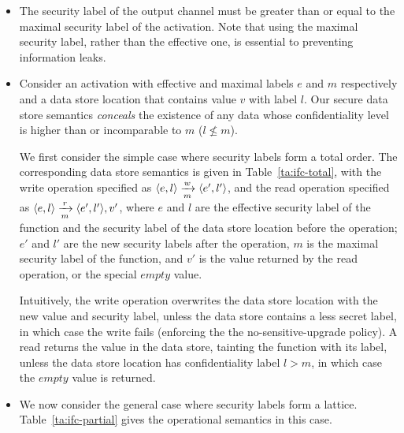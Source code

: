 \begin{itemize}
        \begin{itemize}
            \item The security label of the output channel must be 
                greater than or equal to the maximal security label of 
                the activation.  Note that using the maximal security 
                label, rather than the effective one, is essential to 
                preventing information leaks.

            \item Consider an activation with effective and maximal 
                labels $e$ and $m$ respectively and a data store 
                location that contains value $v$ with label $l$.  Our 
                secure data store semantics \emph{conceals} the 
                existence of any data whose confidentiality level is 
                higher than or incomparable to $m$ ($l \nleq m$).  
                
                We first consider the simple case where security 
                labels form a total order. The corresponding data 
                store semantics is given in Table~\ref{ta:ifc-total}, 
                with the write operation specified as 
                $\langle e,l \rangle \xrightarrow[m]{w} \langle e',l' \rangle$, and the 
                read operation specified as 
                $\langle e,l \rangle \xrightarrow[m]{r} \langle e',l' \rangle, v'$, 
                where $e$ and $l$ are the effective security label of 
                the function and the security label of the data store 
                location before the operation; $e'$ and $l'$ are the 
                new security labels after the operation, $m$ is the 
                maximal security label of the function, and $v'$ is 
                the value returned by the read operation, or the 
                special $empty$ value.

                Intuitively, the write operation overwrites the data 
                store location with the new value and security label, 
                unless the data store contains a less secret label, in 
                which case the write fails (enforcing the the 
                no-sensitive-upgrade policy).  A read returns the 
                value in the data store, tainting the function with 
                its label, unless the data store location has 
                confidentiality label $l>m$, in which case the $empty$ 
                value is returned.  
        
            \item We now consider the general case where security 
                labels form a lattice.  Table~\ref{ta:ifc-partial} 
                gives the operational semantics in this case.  


\end{itemize}
\end{itemize}
